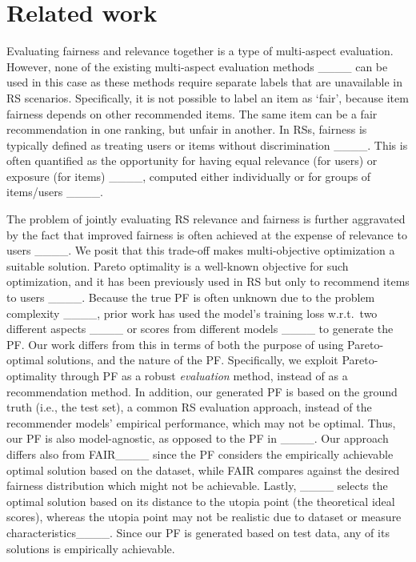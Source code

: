 \section{Related work}
\label{s:prev_work}

Evaluating fairness and relevance together is a type of multi-aspect evaluation. 
However, none of the existing multi-aspect evaluation methods ____ can be used in this case as 
these methods require separate labels that are unavailable in RS scenarios. 
Specifically, it is not possible to label an item as `fair', because item fairness depends on other recommended items. The same item can be a fair recommendation in one ranking, but unfair in another. In RSs, fairness is typically defined as treating users or items without discrimination ____. This is often quantified as the opportunity for 
having equal relevance (for users) or exposure (for items) 
____, computed either individually or for
groups of items/users ____. 

The problem of jointly evaluating RS relevance and fairness is further aggravated by the fact that improved fairness is often achieved at the expense of relevance to users ____. 
We posit that this trade-off makes multi-objective optimization a suitable solution. Pareto optimality is a well-known objective for such optimization, 
and it has been previously used in RS but only to recommend items to users ____. 
Because the true PF is often unknown due to the problem complexity ____, prior work has used the model's training loss w.r.t.~two different aspects ____ or scores from different models ____ to generate the PF. 
Our work differs from this in terms of both the purpose of using Pareto-optimal solutions, and the nature of the PF. Specifically, we exploit Pareto-optimality through PF as a robust \textit{evaluation} method, instead of as a recommendation method. 
In addition, our generated PF is based on the ground truth (i.e., the test set), a common RS evaluation approach, instead of the recommender models' empirical performance, which may not be optimal. Thus, our PF is also model-agnostic, as opposed to the PF in ____. 
Our approach differs also from FAIR____ since the PF considers the empirically achievable optimal solution based on the dataset, while FAIR compares against the desired fairness distribution which might not be achievable. Lastly, ____ selects the optimal solution based on its distance to the utopia point (the theoretical ideal scores), whereas the utopia point may not be realistic due to dataset or measure characteristics____. Since our PF is generated based on test data, any of its solutions is empirically achievable.